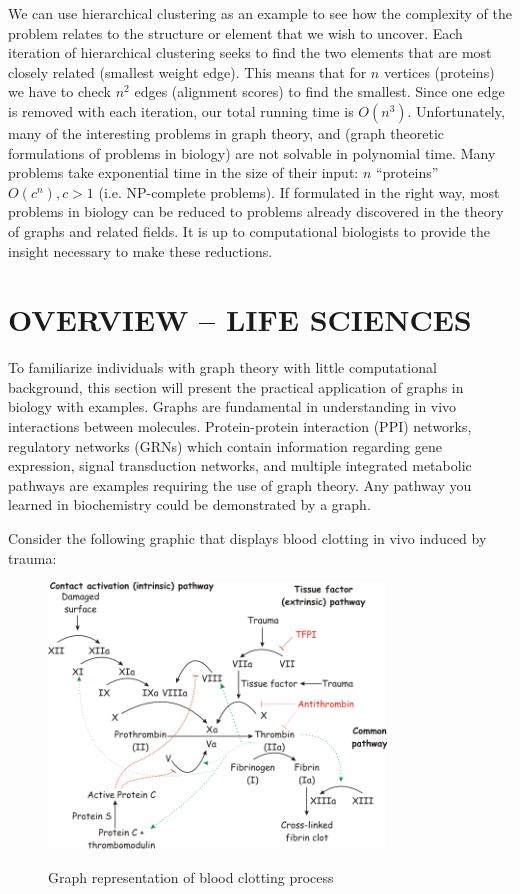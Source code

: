 \documentclass[11pt]{article}
\begin{document}
We can use hierarchical clustering as an example to see how the complexity of the problem 
relates to the structure or element that we wish to uncover. 
Each iteration of hierarchical clustering seeks to find the two elements that are most 
closely related (smallest weight edge). This means that for $n$ vertices (proteins) we have to 
check $n^2$ edges (alignment scores) to find the smallest. 
Since one edge is removed with each iteration, our total running time is $O(n^3)$. 
Unfortunately, many of the interesting problems in graph theory, and (graph theoretic formulations of problems in biology) 
are not solvable in polynomial time. Many problems take exponential time in the size of their input: $n$ “proteins” $O(c^n), c>1$ 
(i.e. NP-complete problems). 
If formulated in the right way, most problems in biology can be reduced to problems 
already discovered in the theory of graphs and related fields. 
It is up to computational biologists to provide the insight necessary to make 
these reductions. 

\section*{OVERVIEW -- LIFE SCIENCES}

To familiarize individuals with graph theory with little computational background, 
this section will present the practical application of graphs in biology with examples. 
Graphs are fundamental in understanding in vivo interactions between molecules. 
Protein-protein interaction (PPI) networks, regulatory networks (GRNs) which 
contain information regarding gene expression, signal transduction networks, and 
multiple integrated metabolic pathways are examples requiring the use of graph theory. 
Any pathway you learned in biochemistry could be demonstrated by a graph.

Consider the following graphic that displays blood clotting in vivo induced by trauma:

\begin{figure}
  \includegraphics[width= 0.8\textwidth]{graph-bio.png}
  \label{fig:graph-bio}
  \caption{Graph representation of blood clotting process}
\end{figure}
\end{document}
